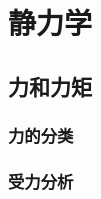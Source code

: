\documentclass[color=purple,openany]{textbook-cn}
\begin{document}
\begin{Link}
\zhlipsum[1]
\end{Link}




\part{静力学}


\chaptersaying{\lipsum[1][5]}
\chapter{力和力矩}


\begin{Block}[章节引入]
\lipsum[1-3]
\end{Block}


\section{力的分类}

\begin{Point}
\lipsum[2]
\end{Point}

\begin{Case}
\item \lipsum[1][3]
\item \lipsum[1][3]
\item \lipsum[1][3]
\item \lipsum[1][3]
\end{Case}

\begin{Link}
\zhlipsum[1]
\end{Link}



\section{受力分析}

\begin{Point}
\lipsum[2]
\end{Point}

\begin{Case}
\item \lipsum[1][3]
\item \lipsum[1][3]
\item \lipsum[1][3]
\item \lipsum[1][3]
\end{Case}

\begin{Link}
\zhlipsum[1]
\end{Link}
\end{document}
